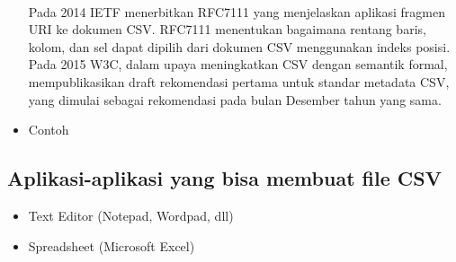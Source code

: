 \documentclass{article}
\begin{document}
\begin{itemize}
                \paragraph{}Pada 2014 IETF menerbitkan RFC7111 yang menjelaskan aplikasi fragmen URI ke dokumen CSV. RFC7111 menentukan bagaimana rentang baris, kolom, dan sel dapat dipilih dari dokumen CSV menggunakan indeks posisi. Pada 2015 W3C, dalam upaya meningkatkan CSV dengan semantik formal, mempublikasikan draft rekomendasi pertama untuk standar metadata CSV, yang dimulai sebagai rekomendasi pada bulan Desember tahun yang sama.
            \newpage
            \item Contoh 
                
        \end{itemize}
    
    \subsection {Aplikasi-aplikasi yang bisa membuat file CSV}
        \begin{itemize}
            \item Text Editor (Notepad, Wordpad, dll)
            \item Spreadsheet (Microsoft Excel)
        \end{itemize}
        
\end{document}
